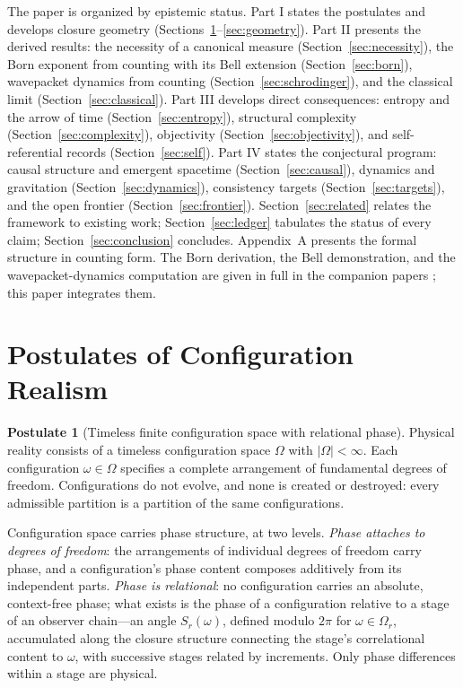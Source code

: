 \documentclass[11pt]{article}
\theoremstyle{definition}
\newtheorem{postulate}{Postulate}
\theoremstyle{remark}
\begin{document}
The paper is organized by epistemic status. Part I states the postulates and develops closure geometry (Sections~\ref{sec:post}--\ref{sec:geometry}). Part II presents the derived results: the necessity of a canonical measure (Section~\ref{sec:necessity}), the Born exponent from counting with its Bell extension (Section~\ref{sec:born}), wavepacket dynamics from counting (Section~\ref{sec:schrodinger}), and the classical limit (Section~\ref{sec:classical}). Part III develops direct consequences: entropy and the arrow of time (Section~\ref{sec:entropy}), structural complexity (Section~\ref{sec:complexity}), objectivity (Section~\ref{sec:objectivity}), and self-referential records (Section~\ref{sec:self}). Part IV states the conjectural program: causal structure and emergent spacetime (Section~\ref{sec:causal}), dynamics and gravitation (Section~\ref{sec:dynamics}), consistency targets (Section~\ref{sec:targets}), and the open frontier (Section~\ref{sec:frontier}). Section~\ref{sec:related} relates the framework to existing work; Section~\ref{sec:ledger} tabulates the status of every claim; Section~\ref{sec:conclusion} concludes. Appendix~A presents the formal structure in counting form. The Born derivation, the Bell demonstration, and the wavepacket-dynamics computation are given in full in the companion papers \cite{TillittBorn,TillittCHSH,TillittSchr}; this paper integrates them.

\section{Postulates of Configuration Realism}\label{sec:post}

\begin{postulate}[Timeless finite configuration space with relational phase]\label{post:omega}
Physical reality consists of a timeless configuration space $\Omega$ with $|\Omega| < \infty$. Each configuration $\omega \in \Omega$ specifies a complete arrangement of fundamental degrees of freedom. Configurations do not evolve, and none is created or destroyed: every admissible partition is a partition of the same configurations.

Configuration space carries phase structure, at two levels. \emph{Phase attaches to degrees of freedom}: the arrangements of individual degrees of freedom carry phase, and a configuration's phase content composes additively from its independent parts. \emph{Phase is relational}: no configuration carries an absolute, context-free phase; what exists is the phase of a configuration relative to a stage of an observer chain---an angle $S_r(\omega)$, defined modulo $2\pi$ for $\omega \in \Omega_r$, accumulated along the closure structure connecting the stage's correlational content to $\omega$, with successive stages related by increments. Only phase differences within a stage are physical.
\end{postulate}
\end{document}
